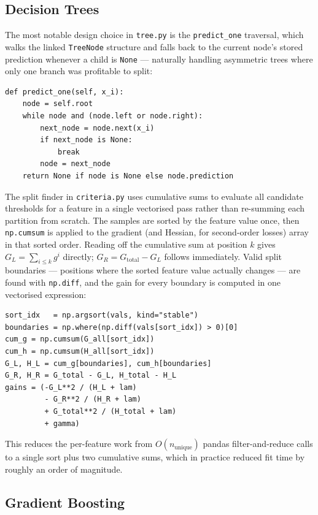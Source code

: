 \documentclass[a4paper, 11pt]{article}
\begin{document}
\subsection{Decision Trees}

The most notable design choice in \texttt{tree.py} is the
\texttt{predict\_one} traversal, which walks the linked
\texttt{TreeNode} structure and falls back to the current node's
stored prediction whenever a child is \texttt{None} — naturally
handling asymmetric trees where only one branch was profitable to
split:

\begin{verbatim}
def predict_one(self, x_i):
    node = self.root
    while node and (node.left or node.right):
        next_node = node.next(x_i)
        if next_node is None:
            break
        node = next_node
    return None if node is None else node.prediction
\end{verbatim}

The split finder in \texttt{criteria.py} uses cumulative sums to
evaluate all candidate thresholds for a feature in a single vectorised
pass rather than re-summing each partition from scratch. The samples are
sorted by the feature value once, then \texttt{np.cumsum} is applied to
the gradient (and Hessian, for second-order losses) array in that sorted
order. Reading off the cumulative sum at position $k$ gives
$G_L = \sum_{i \leq k} g^i$ directly; $G_R = G_{\text{total}} - G_L$
follows immediately. Valid split boundaries — positions where the sorted
feature value actually changes — are found with \texttt{np.diff},
and the gain for every boundary is computed in one vectorised expression:

\begin{verbatim}
sort_idx   = np.argsort(vals, kind="stable")
boundaries = np.where(np.diff(vals[sort_idx]) > 0)[0]
cum_g = np.cumsum(G_all[sort_idx])
cum_h = np.cumsum(H_all[sort_idx])
G_L, H_L = cum_g[boundaries], cum_h[boundaries]
G_R, H_R = G_total - G_L, H_total - H_L
gains = (-G_L**2 / (H_L + lam)
         - G_R**2 / (H_R + lam)
         + G_total**2 / (H_total + lam)
         + gamma)
\end{verbatim}

This reduces the per-feature work from $O(n_{\text{unique}})$ pandas
filter-and-reduce calls to a single sort plus two cumulative sums,
which in practice reduced fit time by roughly an order of magnitude.

\subsection{Gradient Boosting}
\end{document}
